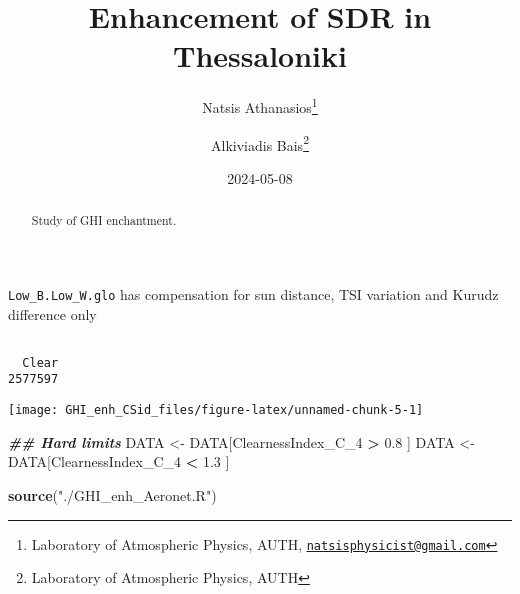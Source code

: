 \documentclass[
  10pt,
  a4paper,oneside]{article}
\title{Enhancement of SDR in Thessaloniki}
\author{Natsis Athanasios\footnote{Laboratory of Atmospheric Physics, AUTH, \href{mailto:natsisphysicist@gmail.com}{\nolinkurl{natsisphysicist@gmail.com}}} \and Alkiviadis Bais\footnote{Laboratory of Atmospheric Physics, AUTH}}
\date{2024-05-08}
\newenvironment{Shaded}{\begin{snugshade}}{\end{snugshade}}
\newcommand{\DocumentationTok}[1]{\textcolor[rgb]{0.56,0.35,0.01}{\textbf{\textit{#1}}}}
\newcommand{\FloatTok}[1]{\textcolor[rgb]{0.00,0.00,0.81}{#1}}
\newcommand{\FunctionTok}[1]{\textcolor[rgb]{0.13,0.29,0.53}{\textbf{#1}}}
\newcommand{\NormalTok}[1]{#1}
\newcommand{\OtherTok}[1]{\textcolor[rgb]{0.56,0.35,0.01}{#1}}
\newcommand{\SpecialCharTok}[1]{\textcolor[rgb]{0.81,0.36,0.00}{\textbf{#1}}}
\newcommand{\StringTok}[1]{\textcolor[rgb]{0.31,0.60,0.02}{#1}}
\begin{document}
\maketitle
\begin{abstract}
Study of GHI enchantment.
\end{abstract}

{
\hypersetup{linkcolor=}
\setcounter{tocdepth}{4}
\tableofcontents
}
\texttt{Low\_B.Low\_W.glo} has compensation for sun distance, TSI variation and Kurudz difference only

\begin{Shaded}
\end{Shaded}

\begin{verbatim}

  Clear 
2577597 
\end{verbatim}

\begin{Shaded}
\end{Shaded}

\begin{center}\texttt{[image: GHI\_enh\_CSid\_files/figure-latex/unnamed-chunk-5-1]} \end{center}

\begin{Shaded}
\begin{Highlighting}[]
\DocumentationTok{\#\# Hard limits}
\NormalTok{DATA }\OtherTok{\textless{}{-}}\NormalTok{ DATA[ClearnessIndex\_C\_4 }\SpecialCharTok{\textgreater{}} \FloatTok{0.8}\NormalTok{ ]}
\NormalTok{DATA }\OtherTok{\textless{}{-}}\NormalTok{ DATA[ClearnessIndex\_C\_4 }\SpecialCharTok{\textless{}} \FloatTok{1.3}\NormalTok{ ]}

\FunctionTok{source}\NormalTok{(}\StringTok{"./GHI\_enh\_Aeronet.R"}\NormalTok{)}
\end{Highlighting}
\end{Shaded}
\end{document}
